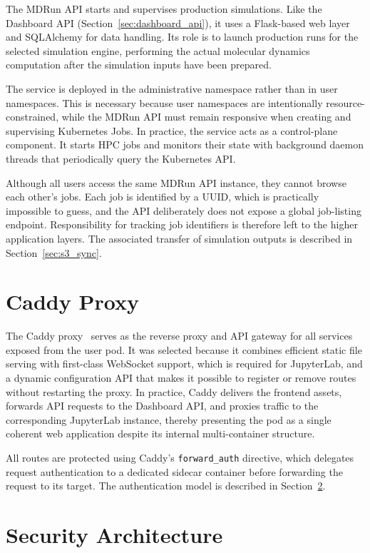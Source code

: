 \documentclass[
  digital,     %
  color,       %
  oneside,     %
  nosansbold,  %
  nocolorbold, %
  lof,         %
  lot,         %
]{fithesis4}
\begin{document}
The MDRun API starts and supervises production simulations. Like the Dashboard API (Section~\ref{sec:dashboard_api}), it uses a Flask-based web layer and SQLAlchemy for data handling. Its role is to launch production runs for the selected simulation engine, performing the actual molecular dynamics computation after the simulation inputs have been prepared.

The service is deployed in the administrative namespace rather than in user namespaces. This is necessary because user namespaces are intentionally resource-constrained, while the MDRun API must remain responsive when creating and supervising Kubernetes Jobs. In practice, the service acts as a control-plane component. It starts HPC jobs and monitors their state with background daemon threads that periodically query the Kubernetes API.

Although all users access the same MDRun API instance, they cannot browse each other's jobs. Each job is identified by a UUID, which is practically impossible to guess, and the API deliberately does not expose a global job-listing endpoint. Responsibility for tracking job identifiers is therefore left to the higher application layers. The associated transfer of simulation outputs is described in Section~\ref{sec:s3_sync}.

\section{Caddy Proxy}
\label{sec:caddy_proxy}

The Caddy proxy~\cite{caddy} serves as the reverse proxy and API gateway for all services exposed from the user pod. It was selected because it combines efficient static file serving with first-class WebSocket support, which is required for JupyterLab, and a dynamic configuration API that makes it possible to register or remove routes without restarting the proxy. In practice, Caddy delivers the frontend assets, forwards API requests to the Dashboard API, and proxies traffic to the corresponding JupyterLab instance, thereby presenting the pod as a single coherent web application despite its internal multi-container structure.

All routes are protected using Caddy's \texttt{forward\_auth} directive, which delegates request authentication to a dedicated sidecar container before forwarding the request to its target. The authentication model is described in Section~\ref{sec:security_architecture}.


\section{Security Architecture}
\label{sec:security_architecture}
\end{document}
